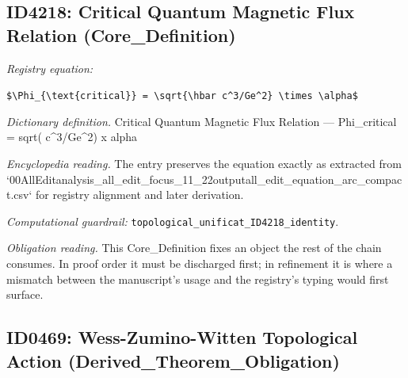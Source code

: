 \documentclass[11pt]{article}
\theoremstyle{remark}
\begin{document}
\subsection{ID4218: Critical Quantum Magnetic Flux Relation (Core\_Definition)}

\noindent\textit{Registry equation:}\par
{\small\texttt{\$\textbackslash{}Phi\_\{\textbackslash{}text\{critical\}\} = \textbackslash{}sqrt\{\textbackslash{}hbar c\textasciicircum{}3/Ge\textasciicircum{}2\} \textbackslash{}times \textbackslash{}alpha\$}}\par\medskip
\noindent\textit{Dictionary definition.} Critical Quantum Magnetic Flux Relation --- Phi\_critical = sqrt( c\textasciicircum{}3/Ge\textasciicircum{}2) x alpha\par\medskip
\noindent\textit{Encyclopedia reading.} The entry preserves the equation exactly as extracted from `00AllEditanalysis\_all\_edit\_focus\_11\_22outputall\_edit\_equation\_arc\_compact.csv` for registry alignment and later derivation.
\par\medskip\noindent\textit{Computational guardrail:} \texttt{topological\_unificat\_ID4218\_identity}.
\par\medskip\noindent\textit{Obligation reading.} This Core\_Definition fixes an object the rest of the chain consumes. In proof order it must be discharged first; in refinement it is where a mismatch between the manuscript's usage and the registry's typing would first surface.

\subsection{ID0469: Wess-Zumino-Witten Topological Action (Derived\_Theorem\_Obligation)}
\end{document}
